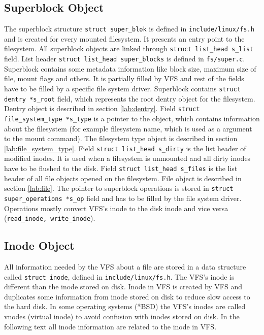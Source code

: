 \subsection{Superblock Object}
The superblock structure \texttt{struct super\_blok} is defined in
\texttt{include/linux/fs.h} and is created for every mounted filesystem. It presents
an entry point to the filesystem. All superblock objects are linked through
\texttt{struct list\_head s\_list} field. List header \texttt{struct list\_head
super\_blocks} is defined in \texttt{fs/super.c}. Superblock contains some metadata
information like block size, maximum size of file, mount flags and others. It is
partially filled by VFS and rest of the fields have to be filled by a specific file
system driver. Superblock contains \texttt{struct dentry *s\_root} field, which
represents the root dentry object for the filesystem. Dentry object is described in section
\ref{lab:dentry}. Field \texttt{struct file\_system\_type *s\_type} is a pointer
to the object, which contains information about the filesystem (for example filesystem
name, which is used as a argument to the mount command). The filesystem type object is
described in section \ref{lab:file_system_type}. Field \texttt{struct list\_head
s\_dirty} is the list header of modified inodes. It is used when a filesystem is
unmounted and all dirty inodes have to be flushed to the disk. Field \texttt{struct
list\_head s\_files} is the list header of all file objects opened on the filesystem. File
object is described in section \ref{lab:file}. The pointer to superblock operations is
stored in \texttt{struct super\_operations *s\_op} field and has to be filled by the file
system driver. Operations mostly convert VFS's inode to the disk inode and
vice versa (\texttt{read\_inode, write\_inode}).

\subsection{Inode Object}
\label{lab:inode}
All information needed by the VFS about a file are stored in a data structure called
\texttt{struct inode}, defined in \texttt{include/linux/fs.h}. The VFS's inode is
different than the inode stored on disk. Inode in VFS is created by VFS and duplicates
some information from inode stored on disk to reduce slow access to the hard disk. In
some operating systems (*BSD) the VFS's inodes are called vnodes (virtual inode) to
avoid confusion with inodes stored on disk. In the following text all inode
information are related to the inode in VFS.


